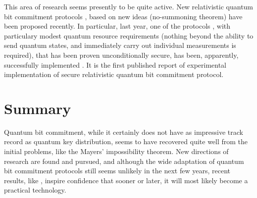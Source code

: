 \documentclass[10pt]{article}
\begin{document}

This area of research seems presently to be quite active. New relativistic quantum bit commitment
protocols \cite{Kent11}, based on new ideas (no-summoning theorem\footnotemark \cite{Mayers13}) 
have been proposed recently. In particular, last year, one of the protocols \cite{Mayers12}, 
with particulary modest quantum resource requirements (nothing beyond the ability to send quantum
states, and immediately carry out individual measurements is required), that has been proven 
unconditionally secure, has been, apparently, successfully implemented \cite{Lunghi14}. It is the
first published report of experimental implementation of secure relativistic quantum bit commitment 
protocol.


\section{Summary}

Quantum bit commitment, while it certainly does not have as impressive track record as quantum key
distribution, seems to have recovered quite well from the initial problems, like the Mayers'
impossibility theorem. New directions of research are found and pursued, and although the wide
adaptation of quantum bit commitment protocols still seems unlikely in the next few years, recent 
results, like \cite{Lunghi14}, inspire confidence that sooner or later, it will most likely become
a practical technology.

\nocite{*}



\end{document}
